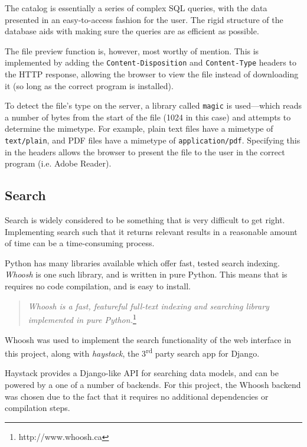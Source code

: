 The catalog is essentially a series of complex SQL queries, with the data
presented in an easy-to-access fashion for the user. The rigid structure of the
database aids with making sure the queries are as efficient as possible.

The file preview function is, however, most worthy of mention. This is
implemented by adding the \verb!Content-Disposition! and \verb!Content-Type!
headers to the HTTP response, allowing the browser to view the file instead of
downloading it (so long as the correct program is installed).

To detect the file's type on the server, a library called \verb!magic! is
used---which reads a number of bytes from the start of the file (1024 in this
case) and attempts to determine the mimetype. For example, plain text files
have a mimetype of \verb!text/plain!, and PDF files have a mimetype of
\verb!application/pdf!.  Specifying this in the headers allows the browser to
present the file to the user in the correct program (i.e. Adobe Reader).

\subsection{Search}
\label{sec:implementation-web-search}

Search is widely considered to be something that is very difficult to get
right. Implementing search such that it returns relevant results in
a reasonable amount of time can be a time-consuming process.

Python has many libraries available which offer fast, tested search indexing.
\emph{Whoosh} is one such library, and is written in pure Python. This means
that is requires no code compilation, and is easy to install.

\begin{quote}
    \emph{Whoosh is a fast, featureful full-text indexing and searching library
    implemented in pure Python.}\footnote{http://www.whoosh.ca}
\end{quote}

Whoosh was used to implement the search functionality of the web interface in
this project, along with \emph{haystack}, the 3\textsuperscript{rd} party
search app for Django.

Haystack provides a Django-like API for searching data models, and can be
powered by a one of a number of backends. For this project, the Whoosh backend
was chosen due to the fact that it requires no additional dependencies or
compilation steps.

